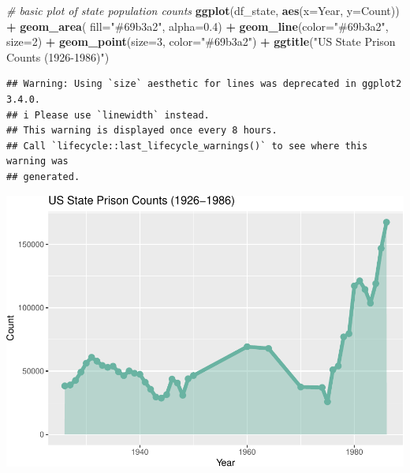 \documentclass[
]{article}
\newenvironment{Shaded}{\begin{snugshade}}{\end{snugshade}}
\newcommand{\AttributeTok}[1]{\textcolor[rgb]{0.13,0.29,0.53}{#1}}
\newcommand{\CommentTok}[1]{\textcolor[rgb]{0.56,0.35,0.01}{\textit{#1}}}
\newcommand{\DecValTok}[1]{\textcolor[rgb]{0.00,0.00,0.81}{#1}}
\newcommand{\FloatTok}[1]{\textcolor[rgb]{0.00,0.00,0.81}{#1}}
\newcommand{\FunctionTok}[1]{\textcolor[rgb]{0.13,0.29,0.53}{\textbf{#1}}}
\newcommand{\NormalTok}[1]{#1}
\newcommand{\SpecialCharTok}[1]{\textcolor[rgb]{0.81,0.36,0.00}{\textbf{#1}}}
\newcommand{\StringTok}[1]{\textcolor[rgb]{0.31,0.60,0.02}{#1}}
\begin{document}
\begin{Shaded}
\begin{Highlighting}[]
\CommentTok{\# basic plot of state population counts}
\FunctionTok{ggplot}\NormalTok{(df\_state, }\FunctionTok{aes}\NormalTok{(}\AttributeTok{x=}\NormalTok{Year, }\AttributeTok{y=}\NormalTok{Count)) }\SpecialCharTok{+}
  \FunctionTok{geom\_area}\NormalTok{( }\AttributeTok{fill=}\StringTok{"\#69b3a2"}\NormalTok{, }\AttributeTok{alpha=}\FloatTok{0.4}\NormalTok{) }\SpecialCharTok{+}
  \FunctionTok{geom\_line}\NormalTok{(}\AttributeTok{color=}\StringTok{"\#69b3a2"}\NormalTok{, }\AttributeTok{size=}\DecValTok{2}\NormalTok{) }\SpecialCharTok{+}
  \FunctionTok{geom\_point}\NormalTok{(}\AttributeTok{size=}\DecValTok{3}\NormalTok{, }\AttributeTok{color=}\StringTok{"\#69b3a2"}\NormalTok{) }\SpecialCharTok{+}
  \FunctionTok{ggtitle}\NormalTok{(}\StringTok{"US State Prison Counts (1926{-}1986)"}\NormalTok{)}
\end{Highlighting}
\end{Shaded}

\begin{verbatim}
## Warning: Using `size` aesthetic for lines was deprecated in ggplot2 3.4.0.
## i Please use `linewidth` instead.
## This warning is displayed once every 8 hours.
## Call `lifecycle::last_lifecycle_warnings()` to see where this warning was
## generated.
\end{verbatim}

\includegraphics{apr19memo_files/figure-latex/unnamed-chunk-3-1.pdf}
\end{document}
